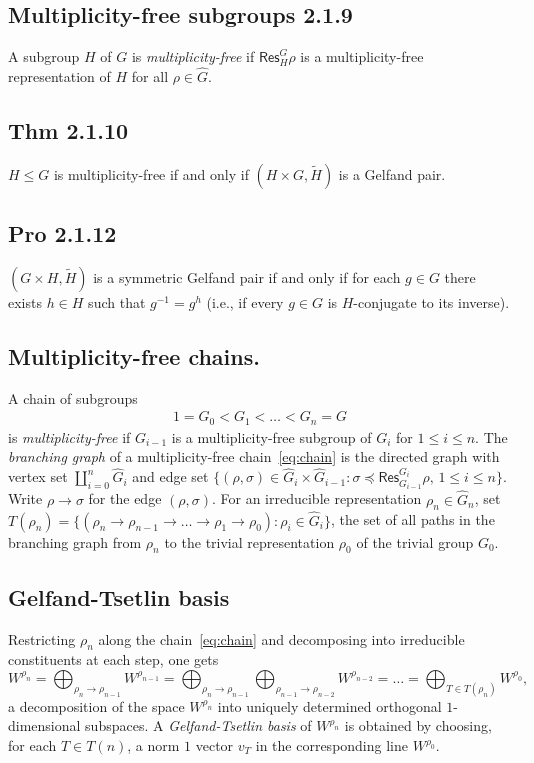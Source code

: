 \documentclass[a4paper]{amsart}
\newcommand{\Res}{\mathsf{Res}}
\begin{document}
\subsection{Multiplicity-free subgroups 2.1.9}
A subgroup $H$ of $G$ is \emph{multiplicity-free} if
$\Res^G_H \rho$ is a multiplicity-free representation of $H$ for all 
$\rho \in \hat{G}$.


\subsection{Thm 2.1.10} $H \leq G$ is multiplicity-free if and only if
$(H \times G, \tilde{H})$ is
a Gelfand pair.


\subsection{Pro 2.1.12} 
$(G \times H, \tilde{H})$ is a symmetric Gelfand pair if and only if 
for each $g \in G$ there exists $h \in H$ such that $g^{-1} = g^h$
(i.e., if every $g \in G$ is $H$-conjugate to its inverse).

\subsection{Multiplicity-free chains.}
A chain of subgroups 
\begin{align*} \label{eq:chain} \tag{$*$}
1 = G_0 < G_1 < \dots < G_n = G
\end{align*}
is
\emph{multiplicity-free} if $G_{i-1}$ is a multiplicity-free subgroup
of $G_i$ for  $1 \leq i \leq n$.
The \emph{branching graph} of  a multiplicity-free chain~\eqref{eq:chain} is the directed graph with  vertex set
$\coprod_{i=0}^n \hat{G}_i$
and edge set $\{(\rho, \sigma) \in \hat{G}_i \times \hat{G}_{i-1} : \sigma \preceq \Res^{G_i}_{G_{i-1}} \rho,\, 1  \leq i \leq n \}$.  Write $\rho \to \sigma$ for the edge $(\rho, \sigma)$.
For an irreducible representation $\rho_n \in \hat{G}_n$, set $T(\rho_n) = \{ (\rho_n \to \rho_{n-1} \to \dots \to \rho_1 \to \rho_0) : \rho_i \in \hat{G}_i\}$,
the set of all paths in the branching graph from $\rho_n$ to the
trivial representation $\rho_0$ of the trivial group $G_0$.

\subsection{Gelfand-Tsetlin basis}

Restricting $\rho_n$ along the chain~\eqref{eq:chain} and decomposing into irreducible
constituents at each step, one gets
\[
W^{\rho_n} = \bigoplus_{\rho_n\to \rho_{n-1}} W^{\rho_{n-1}}
= \bigoplus_{\rho_n\to \rho_{n-1}} \bigoplus_{\rho_{n-1} \to \rho_{n-2}} W^{\rho_{n-2}}
= \dots
= \bigoplus_{T\in T(\rho_n)} W^{\rho_0},
\]
a decomposition of the space $W^{\rho_n}$ into uniquely determined
orthogonal $1$-dimensional subspaces.  A \emph{Gelfand-Tsetlin basis}
of $W^{\rho_n}$ is obtained by choosing, for each $T \in T(n)$, a norm
$1$ vector $v_T$ in the corresponding line $W^{\rho_0}$.
\end{document}
